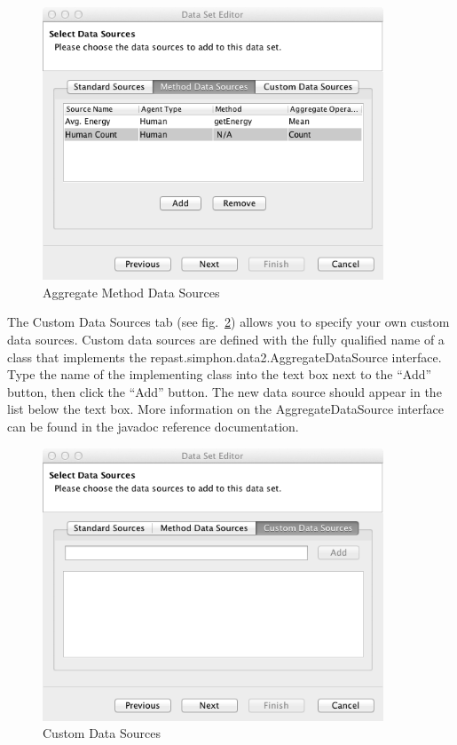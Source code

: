 \documentclass[11pt]{amsart}
\begin{document}
\begin{figure}[h]
\begin{center}
\vspace{.2in}
\centerline {
\includegraphics[width=4in]{images/agg_method.png}
}
\caption{Aggregate Method Data Sources}
\label{fig:agg_method}
\end{center}
\end{figure}

The Custom Data Sources tab (see fig.~\ref{fig:custom_ds}) allows you to specify your own custom data sources. Custom data sources are defined with the fully qualified name of a class that implements the repast.simphon.data2.AggregateDataSource interface. Type the name of the implementing class into the text box next to the ``Add'' button, then click the ``Add'' button. The new data source should appear in the list below the text box. More information on the AggregateDataSource interface can be found in the javadoc reference documentation.

\begin{figure}[h]
\begin{center}
\vspace{.2in}
\centerline {
\includegraphics[width=4in]{images/custom_ds.png}
}
\caption{Custom Data Sources}
\label{fig:custom_ds}
\end{center}
\end{figure}
\end{document}
